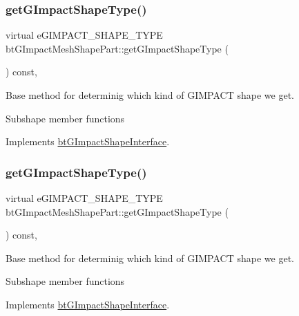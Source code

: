 \subsubsection{\texorpdfstring{get\+G\+Impact\+Shape\+Type()}{getGImpactShapeType()}\hspace{0.1cm}{\footnotesize\ttfamily [1/2]}}
{\footnotesize\ttfamily virtual e\+G\+I\+M\+P\+A\+C\+T\+\_\+\+S\+H\+A\+P\+E\+\_\+\+T\+Y\+PE bt\+G\+Impact\+Mesh\+Shape\+Part\+::get\+G\+Impact\+Shape\+Type (\begin{DoxyParamCaption}{ }\end{DoxyParamCaption}) const\hspace{0.3cm}{\ttfamily [inline]}, {\ttfamily [virtual]}}



Base method for determinig which kind of G\+I\+M\+P\+A\+CT shape we get. 

Subshape member functions 

Implements \hyperlink{classbtGImpactShapeInterface_a25cacbe448997e3f8ec99cb2d4952859}{bt\+G\+Impact\+Shape\+Interface}.

\mbox{\label{classbtGImpactMeshShapePart_a89fb18e93d2f4078576b6789e59891a2}} 
\subsubsection{\texorpdfstring{get\+G\+Impact\+Shape\+Type()}{getGImpactShapeType()}\hspace{0.1cm}{\footnotesize\ttfamily [2/2]}}
{\footnotesize\ttfamily virtual e\+G\+I\+M\+P\+A\+C\+T\+\_\+\+S\+H\+A\+P\+E\+\_\+\+T\+Y\+PE bt\+G\+Impact\+Mesh\+Shape\+Part\+::get\+G\+Impact\+Shape\+Type (\begin{DoxyParamCaption}{ }\end{DoxyParamCaption}) const\hspace{0.3cm}{\ttfamily [inline]}, {\ttfamily [virtual]}}



Base method for determinig which kind of G\+I\+M\+P\+A\+CT shape we get. 

Subshape member functions 

Implements \hyperlink{classbtGImpactShapeInterface_a25cacbe448997e3f8ec99cb2d4952859}{bt\+G\+Impact\+Shape\+Interface}.

